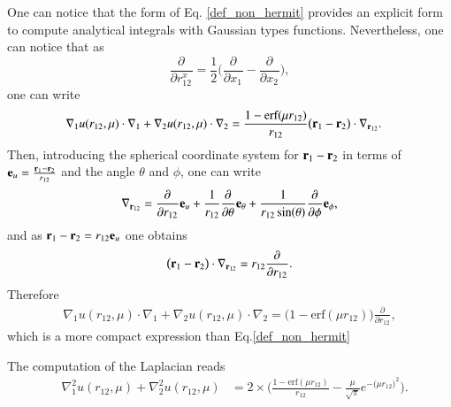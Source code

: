 \documentclass[aip,jcp,reprint,noshowkeys,superscriptaddress]{revtex4-1}
\newcommand{\deriv}[3]{\frac{\partial^{#3} #1}{\partial {#2}^{#3}}}
\newcommand{\br}[0]{{\bf {r}}}
\begin{document}
One can notice that the form of Eq. \eqref{def_non_hermit} provides an explicit form to compute analytical integrals with Gaussian types functions. 
Nevertheless, one can notice that as 
\begin{equation}
 \deriv{}{r_{12}^x}{} = \frac{1}{2} \bigg( \deriv{}{x_1}{} - \deriv{}{x_2}{} \bigg),
\end{equation}
one can write 
\begin{equation}
 \begin{aligned}
 \label{eq:nabla_i_nabla0}
& \nabla_1 u(r_{12},\mu) \cdot \nabla_1 + \nabla_2 u(r_{12},\mu) \cdot \nabla_2 = \frac{1 - \text{erf}(\mu r_{12})}{r_{12}} \big( \br{}_1 - \br{}_2 \big) \cdot \nabla_{\br{}_{12}}.
 \end{aligned}
\end{equation}
Then, introducing the spherical coordinate system for $\br{}_1 - \br{}_2$ in terms of ${\bf e}_u= \frac{\br{}_1 - \br{}_2}{r_{12}}$ and the angle $\theta$ and $\phi$, one can write 
\begin{equation}
 \nabla_{\br{}_{12}} = \deriv{}{r_{12}}{} {\bf e}_u + \frac{1}{r_{12}} \deriv{}{\theta}{} {\bf e}_{\theta} + \frac{1}{r_{12} \sin(\theta)} \deriv{}{\phi}{} {\bf e}_\phi,
\end{equation}
and as $\br{}_1 - \br{}_2 = r_{12} {\bf e}_u$ one obtains
\begin{equation}
 \big( \br{}_1 - \br{}_2 \big) \cdot \nabla_{\br{}_{12}} = r_{12} \deriv{}{r_{12}}{}.
\end{equation}
Therefore 
\begin{equation}
 \begin{aligned}
 \label{eq:nabla_i_nabla1}
 \nabla_1 u(r_{12},\mu) \cdot \nabla_1 + \nabla_2 u(r_{12},\mu) \cdot \nabla_2 = \bigg( 1 - \text{erf}(\mu r_{12})\bigg) \deriv{}{r_{12}}{},
 \end{aligned}
\end{equation}
which is a more compact expression than Eq.\eqref{def_non_hermit}

The computation of the Laplacian reads 
\begin{equation}
 \begin{aligned}
 \label{eq:d2_x1_2}
 &\nabla_1^2 u(r_{12},\mu) + \nabla_2^2u(r_{12},\mu)
 & = 2 \times \bigg( \frac{1 - \text{erf}(\mu r_{12})}{r_{12}} - \frac{\mu}{\sqrt{\pi}} e^{-\big(\mu r_{12} \big)^2}  \bigg).
 \end{aligned}
\end{equation}
\end{document}
